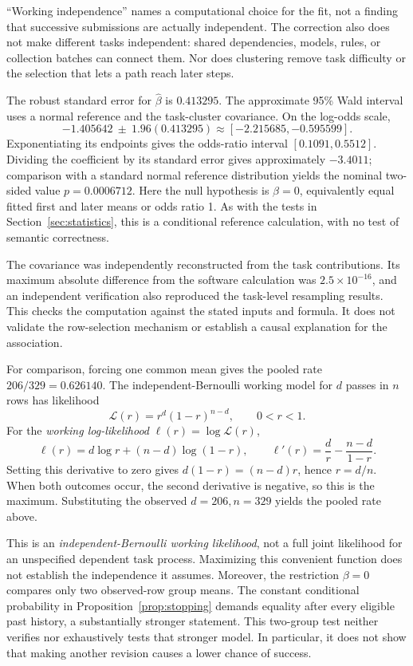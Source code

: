 ``Working independence'' names a computational choice for the fit, not a finding that successive submissions are actually independent. The correction also does not make different tasks independent: shared dependencies, models, rules, or collection batches can connect them. Nor does clustering remove task difficulty or the selection that lets a path reach later steps.

The robust standard error for $\widehat\beta$ is $0.413295$. The approximate 95\% Wald interval uses a normal reference and the task-cluster covariance. On the log-odds scale,
\[
-1.405642\ \pm\ 1.96(0.413295)
\approx[-2.215685,-0.595599].
\]
Exponentiating its endpoints gives the odds-ratio interval $[0.1091,0.5512]$. Dividing the coefficient by its standard error gives approximately $-3.4011$; comparison with a standard normal reference distribution yields the nominal two-sided value $p=0.0006712$. Here the null hypothesis is $\beta=0$, equivalently equal fitted first and later means or odds ratio 1. As with the tests in Section~\ref{sec:statistics}, this is a conditional reference calculation, with no test of semantic correctness.

The covariance was independently reconstructed from the task contributions. Its maximum absolute difference from the software calculation was $2.5\times10^{-16}$, and an independent verification also reproduced the task-level resampling results. This checks the computation against the stated inputs and formula. It does not validate the row-selection mechanism or establish a causal explanation for the association.

For comparison, forcing one common mean gives the pooled rate $206/329=0.626140$. The independent-Bernoulli working model for $d$ passes in $n$ rows has likelihood
\[
 \mathcal L(r)=r^d(1-r)^{n-d},\qquad 0<r<1.
\]
For the \emph{working log-likelihood} $\ell(r)=\log\mathcal L(r)$,
\[
 \ell(r)=d\log r+(n-d)\log(1-r),\qquad
 \ell'(r)=\frac d r-\frac{n-d}{1-r}.
\]
Setting this derivative to zero gives $d(1-r)=(n-d)r$, hence $r=d/n$. When both outcomes occur, the second derivative is negative, so this is the maximum. Substituting the observed $d=206,n=329$ yields the pooled rate above.

This is an \emph{independent-Bernoulli working likelihood}, not a full joint likelihood for an unspecified dependent task process. Maximizing this convenient function does not establish the independence it assumes. Moreover, the restriction $\beta=0$ compares only two observed-row group means. The constant conditional probability in Proposition~\ref{prop:stopping} demands equality after every eligible past history, a substantially stronger statement. This two-group test neither verifies nor exhaustively tests that stronger model. In particular, it does not show that making another revision causes a lower chance of success.

